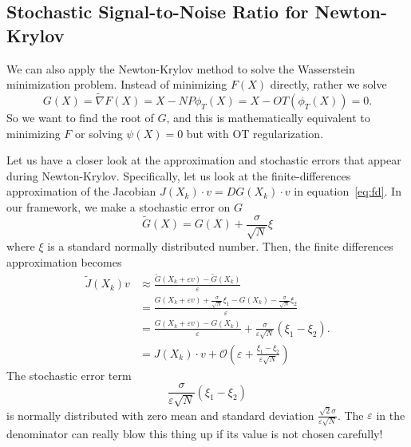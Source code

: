 \documentclass{article}
\begin{document}
\subsection{Stochastic Signal-to-Noise Ratio for Newton-Krylov}
We can also apply the Newton-Krylov method to solve the Wasserstein minimization problem. Instead of minimizing $F(X)$ directly, rather we solve
\begin{equation} \label{eq:particle_nk}
    G(X) = \tilde{\nabla} F(X) = X - NP\phi_T(X) = X - OT(\phi_T(X)) = 0.
\end{equation}
So we want to find the root of $G$, and this is mathematically equivalent to minimizing $F$ or solving $\psi(X) = 0$ but with OT regularization.

Let us have a closer look at the approximation and stochastic errors that appear during Newton-Krylov. Specifically, let us look at the finite-differences approximation of the Jacobian $J(X_k) \cdot v = DG(X_k) \cdot v$ in equation~\eqref{eq:fd}. In our framework, we make a stochastic error on $G$
\begin{equation}
    \tilde{G}(X) = G(X) + \frac{\sigma}{\sqrt{N}} \xi
\end{equation}
where $\xi$ is a standard normally distributed number. Then, the finite differences approximation becomes
\begin{align}
    \tilde{J}(X_k) v &\approx \frac{\tilde{G}(X_k + \varepsilon v) - \tilde{G}(X_k)}{\varepsilon}  \\ &= \frac{G(X_k + \varepsilon v) + \frac{\sigma}{\sqrt{N}} \xi_1 - G(X_k) -  \frac{\sigma}{\sqrt{N}} \xi_2}{\varepsilon} \\
    &= \frac{G(X_k + \varepsilon v) - G(X_k)}{\varepsilon} + \frac{\sigma}{\varepsilon \sqrt{N}}(\xi_1 - \xi_2). \\
    &= J(X_k) \cdot v + \mathcal{O}\left(\varepsilon + \frac{\xi_1 - \xi_2}{\varepsilon \sqrt{N}} \right)
\end{align}
The stochastic error term
\begin{equation}
    \frac{\sigma}{\varepsilon \sqrt{N}}(\xi_1 - \xi_2)
\end{equation}
is normally distributed with zero mean and standard deviation $ \frac{\sqrt{2}\sigma}{\varepsilon \sqrt{N}}$. The $\varepsilon$ in the denominator can really blow this thing up if its value is not chosen carefully!
\end{document}
